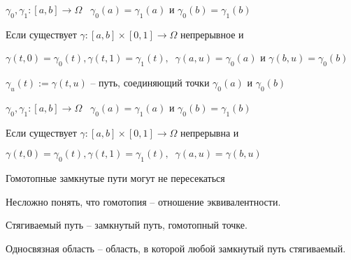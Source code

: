 
\begin{definition}\thmslashn
	
	$\gamma_0, \gamma_1:[a,b]\to \Omega \;\;\; \gamma_0(a) = \gamma_1(a)$ и $\gamma_0(b) = \gamma_1(b)$
	
	Если существует $\gamma:[a, b] \times [0, 1] \to \Omega$ непрерывное и
	
	$\gamma(t, 0) = \gamma_0(t), \gamma(t, 1) = \gamma_1(t), \;\;\gamma(a, u) = \gamma_0(a)$ и $\gamma(b, u) = \gamma_0(b)$
	
	$\gamma_u(t):= \gamma(t, u)$ -- путь, соединяющий точки $\gamma_0(a)$ и $\gamma_0(b)$
	
\end{definition}

\begin{definition}\thmslashn
	
	$\gamma_0, \gamma_1:[a,b]\to \Omega \;\;\; \gamma_0(a) = \gamma_1(a)$ и $\gamma_0(b) = \gamma_1(b)$
	
	Если существует $\gamma:[a, b] \times [0, 1] \to \Omega$ непрерывна и
	
	$\gamma(t, 0) = \gamma_0(t), \gamma(t, 1) = \gamma_1(t), \;\;\gamma(a, u) = \gamma(b, u)$
	
\end{definition}

\begin{remark_author}
	Гомотопные замкнутые пути могут не пересекаться
\end{remark_author}

Несложно понять, что гомотопия -- отношение эквивалентности.

\begin{definition}
	Стягиваемый путь -- замкнутый путь, гомотопный точке.
\end{definition}

\begin{definition}
	Односвязная область -- область, в которой любой замкнутый путь стягиваемый.
\end{definition}

